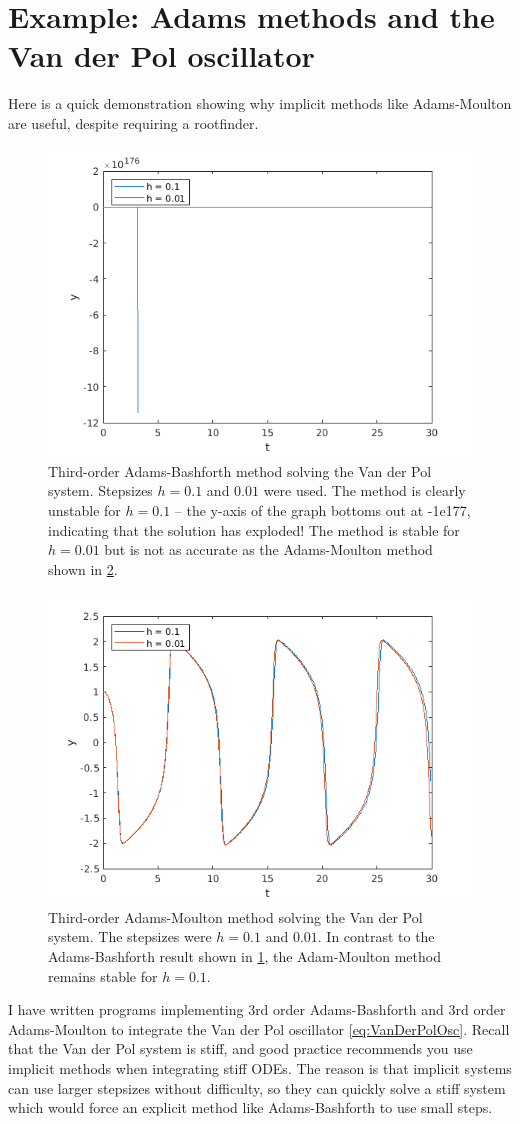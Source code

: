 \documentclass[hidelinks,notitlepage]{book}
\begin{document}
\section{Example: Adams methods and the Van der Pol oscillator}
Here is a quick demonstration showing why implicit methods like Adams-Moulton are useful, despite requiring a rootfinder.  
\begin{figure}[h!]
	\centering
	\includegraphics[width=0.6\columnwidth]{AdamsBashforth3VanderPol.png}
	\caption{Third-order Adams-Bashforth method solving the Van der Pol system.  Stepsizes $h = 0.1$ and $0.01$ were used.  The method is clearly unstable for $h = 0.1$ -- the y-axis of the graph bottoms out at -1e177, indicating that the solution has exploded!  The method is stable for $h = 0.01$ but is not as accurate as the Adams-Moulton method shown in \cref{fig:AdamsMoulton3VanderPol}.}
	\label{fig:AdamsBashforth3VanderPol}
\end{figure}
\begin{figure}[h!]
	\centering
	\includegraphics[width=0.6\columnwidth]{AdamsMoulton3VanderPol.png}
	\caption{Third-order Adams-Moulton method solving the Van der Pol system.  The stepsizes were $h = 0.1$ and $0.01$.  In contrast to the Adams-Bashforth result shown in \cref{fig:AdamsBashforth3VanderPol}, the Adam-Moulton method remains stable for $h = 0.1$.}
	\label{fig:AdamsMoulton3VanderPol}
\end{figure}
I have written programs implementing 3rd order Adams-Bashforth and 3rd order Adams-Moulton to integrate the Van der Pol oscillator \cref{eq:VanDerPolOsc}.  Recall that the Van der Pol system is stiff, and good practice recommends you use implicit methods when integrating stiff ODEs.  The reason is that implicit systems can use larger stepsizes without difficulty, so they can quickly solve a stiff system which would force an explicit method like Adams-Bashforth to use small steps.  
\end{document}
